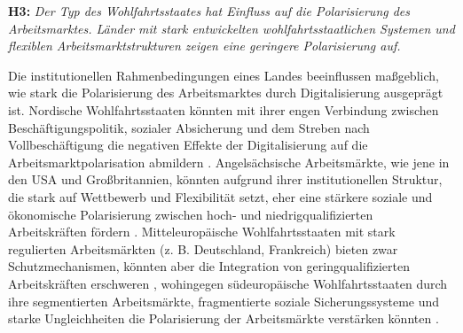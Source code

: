 \textbf{H3:} \textit{Der Typ des Wohlfahrtsstaates hat Einfluss auf die Polarisierung des 
Arbeitsmarktes. Länder mit stark entwickelten wohlfahrtsstaatlichen Systemen und flexiblen 
Arbeitsmarktstrukturen zeigen eine geringere Polarisierung auf.}

Die institutionellen Rahmenbedingungen eines Landes beeinflussen maßgeblich, wie stark die 
Polarisierung des Arbeitsmarktes durch Digitalisierung ausgeprägt ist. Nordische 
Wohlfahrtsstaaten könnten mit ihrer engen Verbindung zwischen Beschäftigungspolitik, sozialer 
Absicherung und dem Streben nach Vollbeschäftigung die negativen Effekte der Digitalisierung auf 
die Arbeitsmarktpolarisation abmildern \parencite[vgl.][S. 28–29]{espingandersen1990thethree}.
Angelsächsische Arbeitsmärkte, wie jene in den USA und Großbritannien, könnten aufgrund ihrer 
institutionellen Struktur, die stark auf Wettbewerb und Flexibilität setzt, eher eine stärkere 
soziale und ökonomische Polarisierung zwischen hoch- und niedrigqualifizierten Arbeitskräften 
fördern \parencite[vgl.][S. 21–22]{hall2001varieties}. Mitteleuropäische Wohlfahrtsstaaten mit 
stark regulierten Arbeitsmärkten (z. B. Deutschland, Frankreich) bieten zwar Schutzmechanismen, 
könnten aber die Integration von geringqualifizierten Arbeitskräften erschweren 
\parencite[vgl.][S. 25–26]{hall2001varieties}, wohingegen südeuropäische Wohlfahrtsstaaten durch 
ihre segmentierten Arbeitsmärkte, fragmentierte soziale Sicherungssysteme und starke 
Ungleichheiten die Polarisierung der Arbeitsmärkte verstärken könnten 
\parencite[vgl.][S. 17–19]{ferrera1996thesouthern}.

